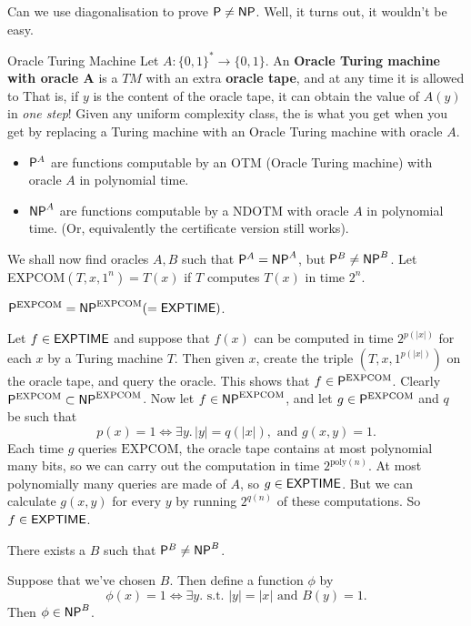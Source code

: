 \documentclass{article}
\begin{document}
Can we use diagonalisation to prove $\mathsf{P} \neq \mathsf{NP}$. Well, it turns out, it wouldn't be easy.
\begin{fancydefine}{Oracle Turing Machine}
    Let $A : \{0,1\}^{*} \to \{0,1\}$. An \textbf{Oracle Turing machine with oracle A} is a $TM$ with an extra \textbf{oracle tape}, and at any time it is allowed to  That is, if $y$ is the content of the oracle tape, it can obtain the value of $A(y)$ in \textit{one step}!\gap 
    Given any uniform complexity class, the  is what you get when you get by replacing a Turing machine with an Oracle Turing machine with oracle $A$.
\end{fancydefine}
\begin{exs*}\hspace{0.1cm}
    \begin{itemize}
        \item $\mathsf{P}^{A}$ are functions computable by an OTM (Oracle Turing machine) with oracle $A$ in polynomial time.
        \item $\mathsf{NP}^{A}$ are functions computable by a NDOTM with oracle $A$ in polynomial time. (Or, equivalently the certificate version still works).
    \end{itemize}
\end{exs*}
We shall now find oracles $A,B$ such that $\mathsf{P}^{A} = \mathsf{NP}^{A}$, but $\mathsf{P}^{B} \neq \mathsf{NP}^{B}$. \gap 
Let EXPCOM$(T,x,1^{n}) = T(x)$ if $T$ computes $T(x)$ in time $2^{n}$.
\begin{fancyprop}{}
    $\mathsf{P}^{\text{EXPCOM}}=\mathsf{NP}^{\text{EXPCOM}} (= \mathsf{EXPTIME})$.
\end{fancyprop}
\proof Let $f \in \mathsf{EXPTIME}$ and suppose that $f(x)$ can be computed in time $2^{p(|x|)}$ for each $x$ by a Turing machine $T$. Then given $x$, create the triple $(T,x,1^{p(|x|)})$ on the oracle tape, and query the oracle. This shows that $f \in \mathsf{P}^{\text{EXPCOM}}$. Clearly $\mathsf{P}^{\text{EXPCOM}} \subset \mathsf{NP}^{\text{EXPCOM}}$. Now let $f \in \mathsf{NP}^{\text{EXPCOM}}$, and let $g \in \mathsf{P}^{\text{EXPCOM}}$ and $q$ be such that \[p(x)=1 \Leftrightarrow \exists y. \, |y|=q(|x|), \text{ and } g(x,y)=1.\] Each time $g$ queries $\text{EXPCOM}$, the oracle tape contains at most polynomial many bits, so we can carry out the computation in time $2^{\text{poly}(n)}$. At most polynomially many queries are made of $A$, so $g \in \mathsf{EXPTIME}$. But we can calculate $g(x,y)$ for every $y$ by running $2^{q(n)}$ of these computations. So $f \in \mathsf{EXPTIME}$. \endproof 
\begin{fancyprop}{}
    There exists a $B$ such that $\mathsf{P}^{B} \neq \mathsf{NP}^{B}$.
\end{fancyprop}
\proof Suppose that we've chosen $B$. Then define a function $\phi$ by \[ \phi(x) = 1 \Leftrightarrow \exists y. \text{ s.t. } |y|=|x| \text{ and } B(y)=1.\]
Then $\phi \in \mathsf{NP}^{B}$.
\end{document}
